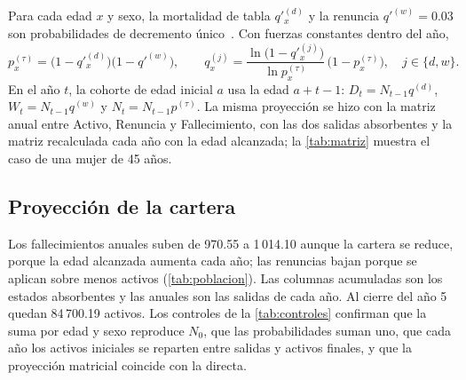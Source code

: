 \documentclass[10pt,a4paper]{article}
\numberwithin{equation}{section}
\newcommand{\tabla}[1]{}
\begin{document}
	Para cada edad \(x\) y sexo, la mortalidad de tabla \(q'^{(d)}_x\) y la renuncia \(q'^{(w)}=0.03\) son probabilidades de decremento único~\cite{Dickson2020}. Con fuerzas constantes dentro del año,
	\begin{equation}\label{eq:decrementos}
		p^{(\tau)}_x=\bigl(1-q'^{(d)}_x\bigr)\bigl(1-q'^{(w)}\bigr),\qquad
		q^{(j)}_x=\frac{\ln\bigl(1-q'^{(j)}_x\bigr)}{\ln p^{(\tau)}_x}\,\bigl(1-p^{(\tau)}_x\bigr),\quad j\in\{d,w\}.
	\end{equation}
	En el año \(t\), la cohorte de edad inicial \(a\) usa la edad \(a+t-1\): \(D_t=N_{t-1}q^{(d)}\), \(W_t=N_{t-1}q^{(w)}\) y \(N_t=N_{t-1}p^{(\tau)}\). La misma proyección se hizo con la matriz anual entre Activo, Renuncia y Fallecimiento, con las dos salidas absorbentes y la matriz recalculada cada año con la edad alcanzada; la \cref{tab:matriz} muestra el caso de una mujer de 45 años.

	\begin{table}[htbp]
		\centering\small
		\begin{minipage}[t]{0.46\textwidth}
			\vspace{0pt}\centering
			\tabla{A_registros}
			\label{tab:registros}
		\end{minipage}\hfill
		\begin{minipage}[t]{0.50\textwidth}
			\vspace{0pt}\centering
			\tabla{A_matriz_F45}
			\label{tab:matriz}
		\end{minipage}
	\end{table}

	\subsection{Proyección de la cartera}

	Los fallecimientos anuales suben de 970.55 a 1\,014.10 aunque la cartera se reduce, porque la edad alcanzada aumenta cada año; las renuncias bajan porque se aplican sobre menos activos (\cref{tab:poblacion}). Las columnas acumuladas son los estados absorbentes y las anuales son las salidas de cada año. Al cierre del año 5 quedan 84\,700.19 activos. Los controles de la \cref{tab:controles} confirman que la suma por edad y sexo reproduce \(N_0\), que las probabilidades suman uno, que cada año los activos iniciales se reparten entre salidas y activos finales, y que la proyección matricial coincide con la directa.
\end{document}
